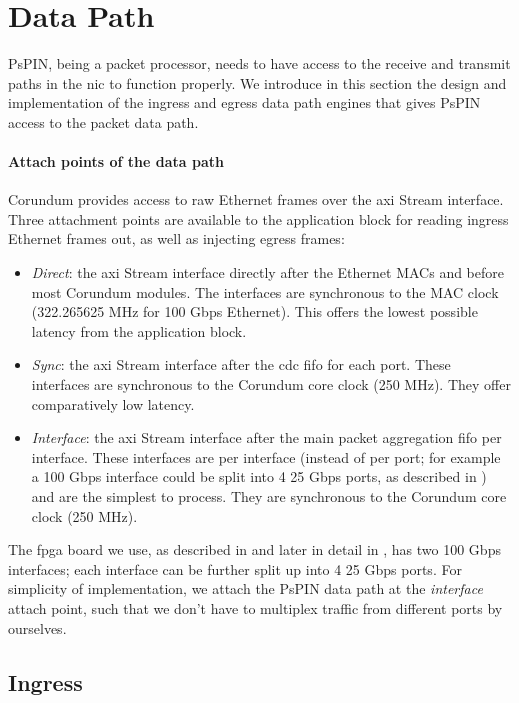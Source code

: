 \section{Data Path}

PsPIN, being a packet processor, needs to have access to the receive and transmit paths in the \ac{nic} to function properly.  We introduce in this section the design and implementation of the ingress and egress data path engines that gives PsPIN access to the packet data path.

\paragraph{Attach points of the data path} Corundum provides access to raw Ethernet frames over the \ac{axi} Stream interface.  Three attachment points are available to the application block for reading ingress Ethernet frames out, as well as injecting egress frames:

\begin{itemize}
    \item \emph{Direct}: the \ac{axi} Stream interface directly after the Ethernet MACs and before most Corundum modules.  The interfaces are synchronous to the MAC clock (322.265625 MHz for 100 Gbps Ethernet).  This offers the lowest possible latency from the application block.
    \item \emph{Sync}: the \ac{axi} Stream interface after the \ac{cdc} \ac{fifo} for each port.  These interfaces are synchronous to the Corundum core clock (250 MHz).  They offer comparatively low latency.
    \item \emph{Interface}: the \ac{axi} Stream interface after the main packet aggregation \ac{fifo} per interface.  These interfaces are per interface (instead of per port; for example a 100 Gbps interface could be split into 4 25 Gbps ports, as described in ) and are the simplest to process.  They are synchronous to the Corundum core clock (250 MHz).
\end{itemize}

The \ac{fpga} board we use, as described in  and later in detail in , has two 100 Gbps interfaces; each interface can be further split up into 4 25 Gbps ports.  For simplicity of implementation, we attach the PsPIN data path at the \emph{interface} attach point, such that we don't have to multiplex traffic from different ports by ourselves.

\subsection{Ingress} \label{sec:ingress-datapath}

